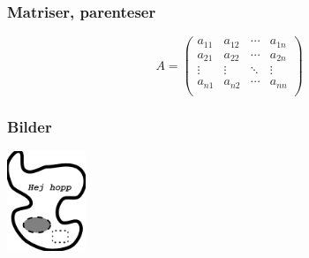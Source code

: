 \begin{frame}[fragile,t]
  \frametitle{Matriser, parenteser}
  \vspace{2em}

  \begin{exlatex}
\begin{displaymath}
A=\left(
\begin{array}{cccc}
a_{11} & a_{12} & \cdots & a_{1n} \\
a_{21} & a_{22} & \cdots & a_{2n} \\
\vdots & \vdots & \ddots & \vdots \\
a_{n1} & a_{n2} & \cdots & a_{nn} \\
\end{array}
\right)
\end{displaymath}
  \end{exlatex}
\end{frame}


\begin{frame}[fragile,t]
  \frametitle{Bilder}
  \vspace{2em}



  \blankline

  \vspace{2mm}
  \begin{exlatex}
  \includegraphics[height=30mm]
    {images/bild.pdf}
  \end{exlatex}

\end{frame}


